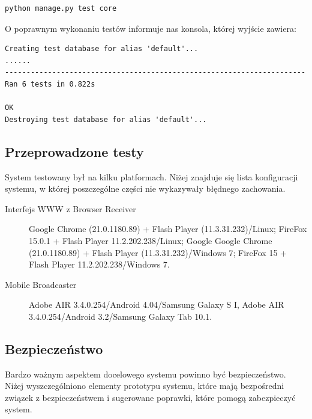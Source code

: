 \lstset{language=Bash}
\begin{lstlisting}
python manage.py test core
\end{lstlisting}

O poprawnym wykonaniu testów informuje nas konsola, której wyjście zawiera:
\begin{lstlisting}
Creating test database for alias 'default'...
......
----------------------------------------------------------------------
Ran 6 tests in 0.822s

OK
Destroying test database for alias 'default'...
\end{lstlisting}

\subsection{Przeprowadzone testy}
\label{sec:EtapIprzeprowadzoneTesty}
System testowany był na kilku platformach. Niżej znajduje się lista konfiguracji systemu, w której poszczególne części nie wykazywały błędnego zachowania.

\begin{description}
    \item[Interfejs WWW z Browser Receiver] Google Chrome (21.0.1180.89) + Flash Player (11.3.31.232)/Linux; FireFox 15.0.1 + Flash Player 11.2.202.238/Linux; Google Google Chrome (21.0.1180.89) + Flash Player (11.3.31.232)/Windows 7;  FireFox 15 + Flash Player 11.2.202.238/Windows 7.
    \item[Mobile Broadcaster] Adobe AIR 3.4.0.254/Android 4.04/Samsung Galaxy S I, Adobe AIR 3.4.0.254/Android 3.2/Samsung Galaxy Tab 10.1.
\end{description}

\subsection{Bezpieczeństwo}

Bardzo ważnym aspektem docelowego systemu powinno być bezpieczeństwo. Niżej wyszczególniono elementy prototypu systemu, które mają bezpośredni związek z bezpieczeństwem i sugerowane poprawki, które pomogą zabezpieczyć system.

